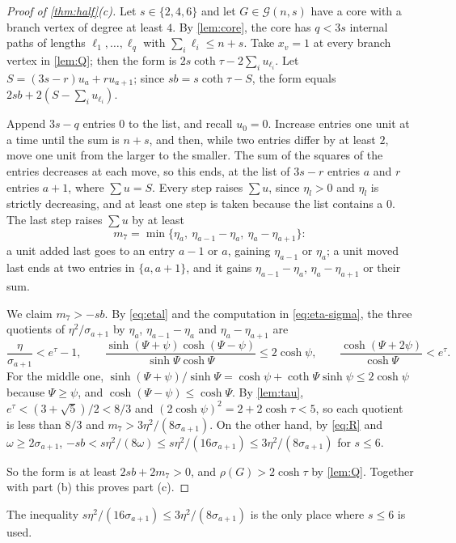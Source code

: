 \documentclass[11pt]{article}
\theoremstyle{definition}
\theoremstyle{remark}
\newcommand{\G}{\mathcal{G}}
\begin{document}
\begin{proof}[Proof of \cref{thm:half}(c)]
Let $s\in\{2,4,6\}$ and let $G\in\G(n,s)$ have a core with a branch vertex of degree at least $4$. By
\cref{lem:core}, the core has $q<3s$ internal paths of lengths $\ell_1,\dots,\ell_q$ with $\sum_i\ell_i\le n+s$. Take
$x_v=1$ at every branch vertex in \cref{lem:Q}; then the form is $2s\coth\tau-2\sum_iu_{\ell_i}$. Let
$S=(3s-r)u_a+ru_{a+1}$; since $sb=s\coth\tau-S$, the form equals $2sb+2(S-\sum_iu_{\ell_i})$.

Append $3s-q$ entries $0$ to the list, and recall $u_0=0$. Increase entries one unit at a time until the sum is $n+s$,
and then, while two entries differ by at least $2$, move one unit from the larger to the smaller. The sum of the squares
of the entries decreases at each move, so this ends, at the list of $3s-r$ entries $a$ and $r$ entries $a+1$, where
$\sum u=S$. Every step raises $\sum u$, since $\eta_l>0$ and $\eta_l$ is strictly decreasing, and at least one step is
taken because the list contains a $0$. The last step raises $\sum u$ by at least
\[
m_7=\min\{\eta_a,\ \eta_{a-1}-\eta_a,\ \eta_a-\eta_{a+1}\}:
\]
a unit added last goes to an entry $a-1$ or $a$, gaining $\eta_{a-1}$ or $\eta_a$; a unit moved last ends at two
entries in $\{a,a+1\}$, and it gains $\eta_{a-1}-\eta_a$, $\eta_a-\eta_{a+1}$ or their sum.

We claim $m_7>-sb$. By \eqref{eq:etal} and the computation in \eqref{eq:eta-sigma}, the three quotients of
$\eta^2/\sigma_{a+1}$ by $\eta_a$, $\eta_{a-1}-\eta_a$ and $\eta_a-\eta_{a+1}$ are
\[
\frac{\eta}{\sigma_{a+1}}<e^\tau-1,\qquad \frac{\sinh(\Psi+\psi)\cosh(\Psi-\psi)}{\sinh\Psi\cosh\Psi}\le2\cosh\psi,\qquad
\frac{\cosh(\Psi+2\psi)}{\cosh\Psi}<e^{\tau}.
\]
For the middle one, $\sinh(\Psi+\psi)/\sinh\Psi=\cosh\psi+\coth\Psi\sinh\psi\le2\cosh\psi$ because $\Psi\ge\psi$, and
$\cosh(\Psi-\psi)\le\cosh\Psi$. By \cref{lem:tau}, $e^\tau<(3+\sqrt5)/2<8/3$ and $(2\cosh\psi)^2=2+2\cosh\tau<5$, so each
quotient is less than $8/3$ and $m_7>3\eta^2/(8\sigma_{a+1})$. On the other hand, by \eqref{eq:R} and
$\omega\ge2\sigma_{a+1}$, $-sb<s\eta^2/(8\omega)\le s\eta^2/(16\sigma_{a+1})\le3\eta^2/(8\sigma_{a+1})$ for $s\le6$.

So the form is at least $2sb+2m_7>0$, and $\rho(G)>2\cosh\tau$ by \cref{lem:Q}. Together with part (b) this proves
part (c).
\end{proof}

The inequality $s\eta^2/(16\sigma_{a+1})\le3\eta^2/(8\sigma_{a+1})$ is the only place where $s\le6$ is used.
\end{document}
